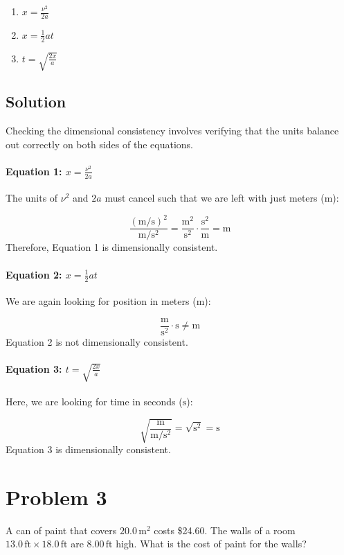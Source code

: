 \documentclass{article}
\newcommand{\meter}{\text{m}}
\newcommand{\second}{\text{s}}
\newcommand{\foot}{\text{ft}}
\begin{document}
\begin{enumerate}
    \item \( x = \frac{\nu^2}{2a} \)
    \item \( x = \frac{1}{2}at \)
    \item \( t = \sqrt{\frac{2x}{a}} \)
\end{enumerate}

\subsection*{Solution}
Checking the dimensional consistency involves verifying that the units balance out correctly on both sides of the equations.

\paragraph{Equation 1: \( x = \frac{\nu^2}{2a} \)}

The units of \( \nu^2 \) and \( 2a \) must cancel such that we are left with just meters (\(\meter\)):

\[
\frac{\left( \meter/\second \right)^2}{\meter/\second^2} = \frac{\meter^2}{\second^2} \cdot \frac{\second^2}{\meter} = \meter
\]
Therefore, Equation 1 is dimensionally consistent.

\paragraph{Equation 2: \( x = \frac{1}{2}at \)}

We are again looking for position in meters (\(\meter\)):

\[
\frac{\meter}{\second^2} \cdot \second \neq \meter
\]
Equation 2 is not dimensionally consistent.

\paragraph{Equation 3: \( t = \sqrt{\frac{2x}{a}} \)}

Here, we are looking for time in seconds (\(\second\)):

\[
\sqrt{\frac{\meter}{\meter/\second^2}} = \sqrt{\second^2} = \second
\]
Equation 3 is dimensionally consistent.

\section*{Problem 3}
A can of paint that covers \(20.0 \, \si{\meter^2}\) costs \$24.60. The walls of a room \(13.0 \, \si{\foot} \times 18.0 \, \si{\foot}\) are \(8.00 \, \si{\foot}\) high. What is the cost of paint for the walls?
\end{document}
